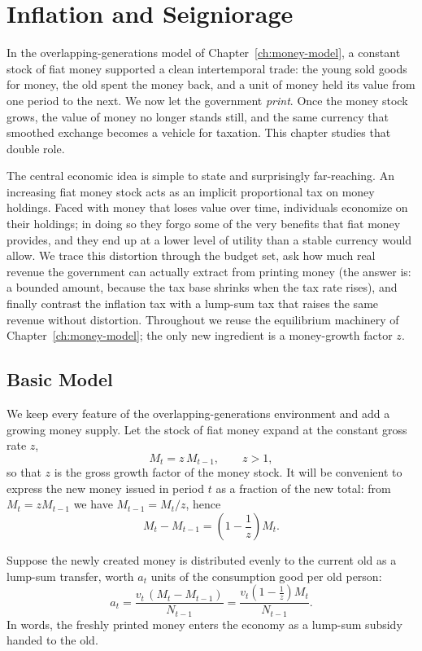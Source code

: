 \chapter{Inflation and Seigniorage}
\label{ch:inflation}

In the overlapping-generations model of Chapter~\ref{ch:money-model}, a constant stock of fiat money supported a clean intertemporal trade: the young sold goods for money, the old spent the money back, and a unit of money held its value from one period to the next. We now let the government \emph{print}. Once the money stock grows, the value of money no longer stands still, and the same currency that smoothed exchange becomes a vehicle for taxation. This chapter studies that double role.

The central economic idea is simple to state and surprisingly far-reaching. An increasing fiat money stock acts as an implicit proportional tax on money holdings. Faced with money that loses value over time, individuals economize on their holdings; in doing so they forgo some of the very benefits that fiat money provides, and they end up at a lower level of utility than a stable currency would allow. We trace this distortion through the budget set, ask how much real revenue the government can actually extract from printing money (the answer is: a bounded amount, because the tax base shrinks when the tax rate rises), and finally contrast the inflation tax with a lump-sum tax that raises the same revenue without distortion. Throughout we reuse the equilibrium machinery of Chapter~\ref{ch:money-model}; the only new ingredient is a money-growth factor $z$.

\section{Basic Model}

We keep every feature of the overlapping-generations environment and add a growing money supply. Let the stock of fiat money expand at the constant gross rate $z$,
\[
M_t = z\,M_{t-1}, \qquad z > 1,
\]
so that $z$ is the gross growth factor of the money stock. It will be convenient to express the new money issued in period $t$ as a fraction of the new total: from $M_t = z M_{t-1}$ we have $M_{t-1} = M_t/z$, hence
\[
M_t - M_{t-1} = \left(1 - \frac{1}{z}\right) M_t .
\]

Suppose the newly created money is distributed evenly to the current old as a lump-sum transfer, worth $a_t$ units of the consumption good per old person:
\[
a_t = \frac{v_t\,(M_t - M_{t-1})}{N_{t-1}}
    = \frac{v_t\left(1 - \tfrac{1}{z}\right) M_t}{N_{t-1}} .
\]
In words, the freshly printed money enters the economy as a lump-sum subsidy handed to the old.

